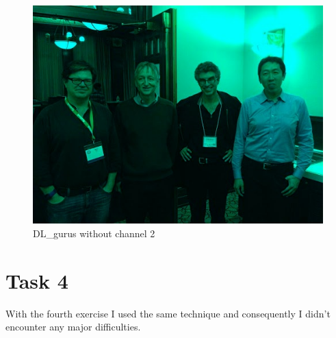 \begin{figure}[!h]
	\centering
	\begin{minipage}{1\textwidth}
		\centering
		\includegraphics[scale=0.25]{images/source/task3/3}
		\caption{DL\_gurus without channel 2}
		\label{fig:1}
	\end{minipage}
\end{figure}


\chapter{Task 4}
With the fourth exercise I used the same technique and consequently I didn't encounter any major difficulties.

